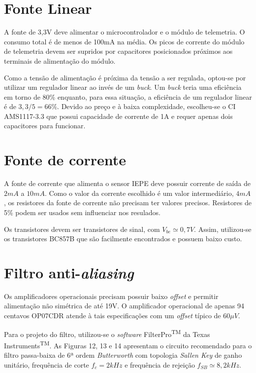 \documentclass[11pt]{abntex2}
\begin{document}
		\section{Fonte Linear}
			A fonte de 3,3V deve alimentar o microcontrolador e o módulo de
			telemetria. O consumo total é de menos de 100mA na média. Os
			picos de corrente do módulo de telemetria devem ser supridos por
			capacitores posicionados próximos aos terminais de alimentação
			do módulo.

			Como a tensão de alimentação é próxima da tensão a ser regulada,
			optou-se por utilizar um regulador linear ao invés de um
			\textit{buck}. Um \textit{buck} teria uma eficiência em torno de
			80\% enquanto, para essa situação, a eficiência de um regulador
			linear é de $3,3/5 = 66\%$. Devido ao preço e à baixa
			complexidade, escolheu-se o CI AMS1117-3.3 que possui capacidade
			de corrente de 1A e requer apenas dois capacitores para
			funcionar.

		\section{Fonte de corrente}
			A fonte de corrente que alimenta o sensor IEPE deve possuir
			corrente de saída de $2mA$ a $10mA$. Como o valor da corrente
			escolhido é um valor intermediário, $4mA$, os resistores da
			fonte de corrente não precisam ter valores precisos. Resistores
			de 5\% podem ser usados sem influenciar nos resulados.

			Os transistores devem ser transistores de sinal, com
			$V_{be}\simeq 0,7V$. Assim, utilizou-se os transistores BC857B
			que são facilmente encontrados e possuem baixo custo. 

		\section{Filtro anti-\textit{aliasing}}
			Os amplificadores operacionais precisam possuir baixo
			\textit{offset} e permitir alimentação não simétrica de até 19V.
			O amplificador operacional de apenas 94 centavos OP07CDR atende
			à tais especificações com um \textit{offset} típico de $60\mu
			V$.

			Para o projeto do filtro, utilizou-se o \textit{software}
			FilterPro\textsuperscript{TM} da Texas
			Instruments\textsuperscript{TM}. As Figuras 12, 13 e 14 apresentam o
			circuito recomendado para o filtro passa-baixa de 6ª ordem
			\textit{Butterworth} com topologia \textit{Sallen Key} de ganho
			unitário, frequência de corte $f_c = 2kHz$ e frequência de
			rejeição $f_{SB}\simeq 8,2kHz$.
\end{document}
